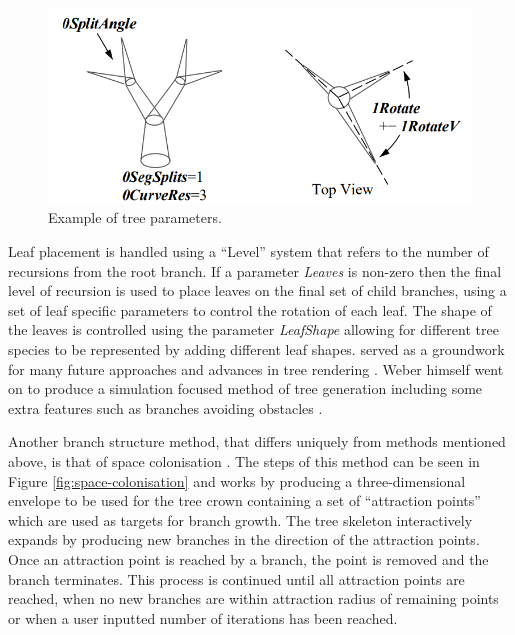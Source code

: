 \documentclass[final]{cmpreport}
\begin{document}
\begin{figure}[ht]
    \includegraphics[scale=0.5]{weber-splits.PNG} 
    \centering
    \captionsetup{justification=centering}
    \caption{Example of tree parameters.}
    \label{fig:weber-splits}
\end{figure}

Leaf placement is handled using a ``Level'' system that refers to the number of recursions from 
the root branch. If a parameter \emph{Leaves} is non-zero then the final level of recursion is 
used to place leaves on the final set of child branches, using a set of leaf specific parameters 
to control the rotation of each leaf. The shape of the leaves is controlled using the parameter 
\emph{LeafShape} allowing for different tree species to be represented by adding different leaf 
shapes.
\cite{weber1995rendering} served as a groundwork for many future approaches and advances in tree 
rendering \citep{remolar2004rendering,wesslen2005real}. Weber himself went on to produce a 
simulation focused method of tree generation including some extra features such as branches 
avoiding obstacles \citep{weber2008simulation}.

Another branch structure method, that differs uniquely from methods mentioned above, is that of 
space colonisation \citep{runions2007colonization}. The steps of this method can be seen in Figure \ref{fig:space-colonisation} 
and works by producing a three-dimensional envelope to be used for the tree crown containing a set 
of ``attraction points'' which are used as targets for branch growth. The tree skeleton interactively 
expands by producing new branches in the direction of the attraction points. Once an attraction point 
is reached by a branch, the point is removed and the branch terminates. This process is continued 
until all attraction points are reached, when no new branches are within attraction radius of 
remaining points or when a user inputted number of iterations has been reached. 
\end{document}
